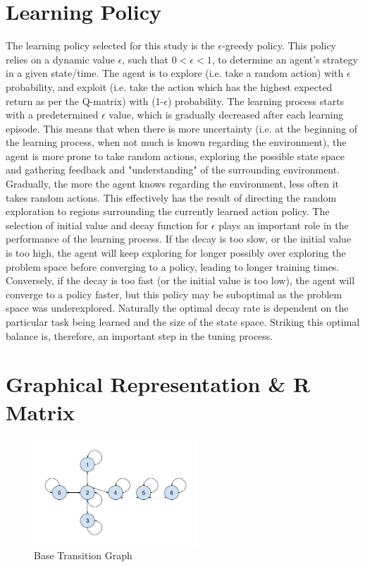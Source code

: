 \documentclass[11pt]{article}
\begin{document}
\section{Learning Policy} \label{sec:learning_policy}
    The learning policy selected for this study is the $\epsilon$-greedy policy. This policy relies on a dynamic value $\epsilon$, such that $0<\epsilon<1$, to determine an agent's strategy in a given state/time. The agent is to explore (i.e. take a random action) with $\epsilon$ probability, and exploit (i.e. take the action which has the highest expected return as per the Q-matrix) with (1-$\epsilon$) probability. The learning process starts with a predetermined $\epsilon$ value, which is gradually decreased after each learning episode. This means that when there is more uncertainty (i.e. at the beginning of the learning process, when not much is known regarding the environment), the agent is more prone to take random actions, exploring the possible state space and gathering feedback and "understanding" of the surrounding environment. Gradually, the more the agent knows regarding the environment, less often it takes random actions. This effectively has the result of directing the random exploration to regions surrounding the currently learned action policy. The selection of initial value and decay function for $\epsilon$ plays an important role in the performance of the learning process. If the decay is too slow, or the initial value is too high, the agent will keep exploring for longer possibly over exploring the problem space before converging to a policy, leading to longer training times. Conversely, if the decay is too fast (or the initial value is too low), the agent will converge to a policy faster, but this policy may be suboptimal as the problem space was underexplored. Naturally the optimal decay rate is dependent on the particular task being learned and the size of the state space. Striking this optimal balance is, therefore, an important step in the tuning process.

\section{Graphical Representation \& R Matrix} \label{sec:r_matrix}

    \begin{figure}[ht]
        \centering
        \includegraphics[height=4cm]{./Images/4_TransitionGraph.jpg}
        \caption{Base Transition Graph}
        \label{fig:transition_graph}
    \end{figure}
\end{document}
